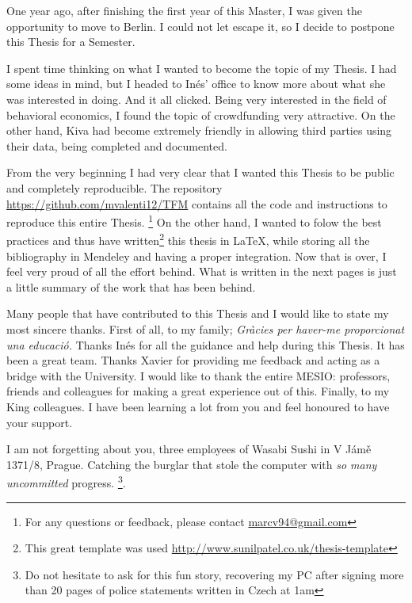 \documentclass[
12pt, %
english, %
onehalfspacing, %
headsepline, %
]{MastersDoctoralThesis} %
\begin{document}
\begin{acknowledgements}
\addchaptertocentry{\acknowledgementname} %
One year ago, after finishing the first year of this Master, I was given the opportunity to move to Berlin. I could not let escape it, so I decide to postpone this Thesis for a Semester. \par
I spent time thinking on what I wanted to become the topic of my Thesis. I had some ideas in mind, but I headed to Inés' office to know more about what she was interested in doing. And it all clicked. Being very interested in the field of behavioral economics, I found the topic of crowdfunding very attractive. On the other hand, Kiva had become extremely friendly in allowing third parties using their data, being completed and documented. \par
From the very beginning I had very clear that I wanted this Thesis to be public and completely reproducible. The repository \url{https://github.com/mvalenti12/TFM} contains all the code and instructions to reproduce this entire Thesis. \footnote{For any questions or feedback, please contact  \href{mailto:marcv94@gmail.com}{marcv94@gmail.com} }\newline
On the other hand, I wanted to folow the best practices and thus have written\footnote{This great template was used \url{http://www.sunilpatel.co.uk/thesis-template}} this thesis in \LaTeX, while storing all the bibliography in Mendeley and having a proper integration. \newline
Now that is over, I feel very proud of all the effort behind. What is written in the next pages is just a little summary of the work that has been behind.
\par
Many people that have contributed to this Thesis and I would like to state my most sincere thanks. \newline
First of all, to my family; \textit{Gràcies per haver-me proporcionat una educació.} \newline
Thanks Inés for all the guidance and help during this Thesis. It has been a great team. Thanks Xavier for providing me feedback and acting as a bridge with the University. \newline
I would like to thank the entire MESIO: professors, friends and colleagues for making a great experience out of this. \newline
Finally, to my King colleagues. I have been learning a lot from you and feel honoured to have your support.
\par
I am not forgetting about you, three employees of Wasabi Sushi in V Jámě 1371/8, Prague. Catching the burglar that stole the computer with \textit{so many uncommitted} progress. \footnote{Do not hesitate to ask for this fun story, recovering my PC after signing more than 20 pages of police statements written in Czech at 1am}.

\end{acknowledgements}
\end{document}
